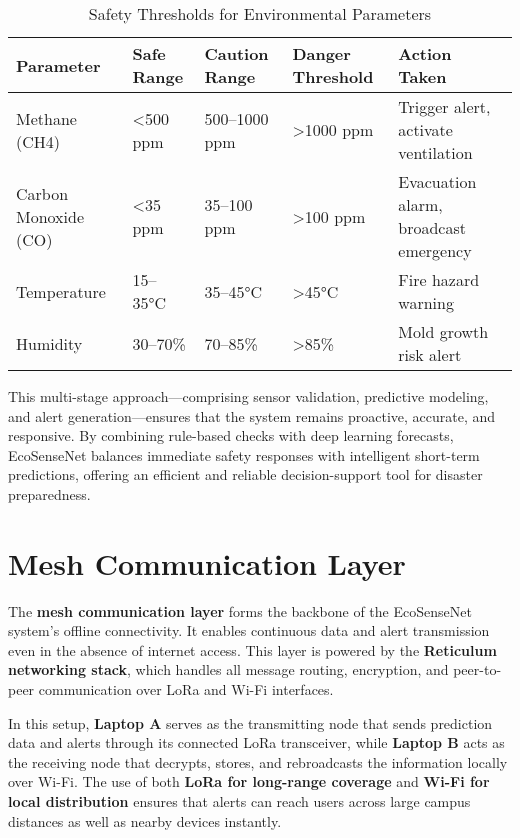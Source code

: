 \begin{table}[H]
\centering
\caption{Safety Thresholds for Environmental Parameters}
\label{tab:thresholds}
\begin{tabular}{|p{3.2cm}|p{2.7cm}|p{2.7cm}|p{2.7cm}|p{3cm}|}
\hline
\textbf{Parameter} & \textbf{Safe Range} & \textbf{Caution Range} & \textbf{Danger Threshold} & \textbf{Action Taken} \\
\hline
Methane (CH4) & <500 ppm & 500–1000 ppm & >1000 ppm & Trigger alert, activate ventilation \\
\hline
Carbon Monoxide (CO) & <35 ppm & 35–100 ppm & >100 ppm & Evacuation alarm, broadcast emergency \\
\hline
Temperature & 15–35°C & 35–45°C & >45°C & Fire hazard warning \\
\hline
Humidity & 30–70\% & 70–85\% & >85\% & Mold growth risk alert \\
\hline

\end{tabular}
\end{table}

This multi-stage approach—comprising sensor validation, predictive modeling, and alert generation—ensures that the system remains proactive, accurate, and responsive. By combining rule-based checks with deep learning forecasts, EcoSenseNet balances immediate safety responses with intelligent short-term predictions, offering an efficient and reliable decision-support tool for disaster preparedness.

\section{Mesh Communication Layer}

The \textbf{mesh communication layer} forms the backbone of the EcoSenseNet system’s offline connectivity. It enables continuous data and alert transmission even in the absence of internet access. This layer is powered by the \textbf{Reticulum networking stack}, which handles all message routing, encryption, and peer-to-peer communication over LoRa and Wi-Fi interfaces.

In this setup, \textbf{Laptop A} serves as the transmitting node that sends prediction data and alerts through its connected LoRa transceiver, while \textbf{Laptop B} acts as the receiving node that decrypts, stores, and rebroadcasts the information locally over Wi-Fi. The use of both \textbf{LoRa for long-range coverage} and \textbf{Wi-Fi for local distribution} ensures that alerts can reach users across large campus distances as well as nearby devices instantly.

